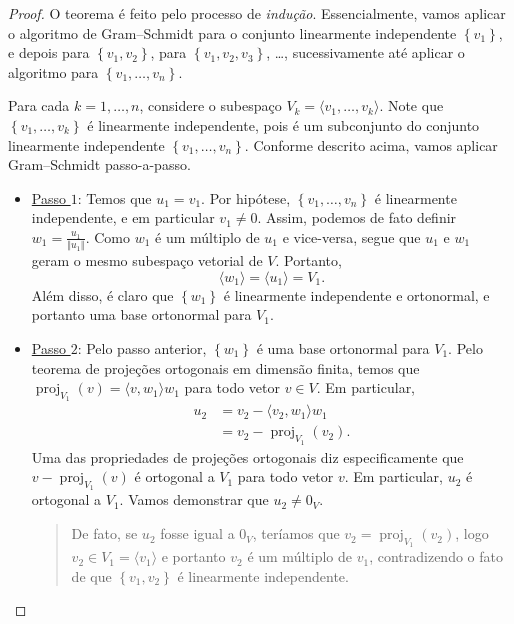 \begin{proof}
	O teorema é feito pelo processo de \textit{indução}. Essencialmente, vamos aplicar o algoritmo de Gram--Schmidt para o conjunto linearmente independente $\left\{v_1\right\}$, e depois para $\left\{v_1,v_2\right\}$, para $\left\{v_1,v_2,v_3\right\}$, \ldots, sucessivamente até aplicar o algoritmo para $\left\{v_1,\ldots,v_n\right\}$.
	
	Para cada $k=1,\ldots,n$, considere o subespaço $V_k=\langle v_1,\ldots,v_k\rangle$. Note que $\left\{v_1,\ldots,v_k\right\}$ é linearmente independente, pois é um subconjunto do conjunto linearmente independente $\left\{v_1,\ldots,v_n\right\}$. Conforme descrito acima, vamos aplicar Gram--Schmidt passo-a-passo.
	
	\begin{itemize}
		\item \uline{Passo $1$}: Temos que $u_1=v_1$. Por hipótese, $\left\{v_1,\ldots,v_n\right\}$ é linearmente independente, e em particular $v_1\neq 0$. Assim, podemos de fato definir $w_1=\frac{u_1}{\Vert u_1\Vert}$. Como $w_1$ é um múltiplo de $u_1$ e vice-versa, segue que $u_1$ e $w_1$ geram o mesmo subespaço vetorial de $V$. Portanto,
		\[\langle w_1\rangle=\langle u_1\rangle=V_1.\]
		Além disso, é claro que $\left\{w_1\right\}$ é linearmente independente e ortonormal, e portanto uma base ortonormal para $V_1$.
		
		\item \uline{Passo $2$}: Pelo passo anterior, $\left\{w_1\right\}$ é uma base ortonormal para $V_1$. Pelo teorema de projeções ortogonais em dimensão finita, temos que $\operatorname{proj}_{V_1}(v)=\langle v,w_1\rangle w_1$ para todo vetor $v\in V$. Em particular,
		\begin{align*}
			u_2
				&=v_2-\langle v_2,w_1\rangle w_1\\
				&=v_2-\operatorname{proj}_{V_1}(v_2).
			\end{align*}
		Uma das propriedades de projeções ortogonais diz especificamente que $v-\operatorname{proj}_{V_1}(v)$ é ortogonal a $V_1$ para todo vetor $v$. Em particular, $u_2$ é ortogonal a $V_1$. Vamos demonstrar que $u_2\neq 0_V$.
		
		\begin{quote}
			De fato, se $u_2$ fosse igual a $0_V$, teríamos que $v_2=\operatorname{proj}_{V_1}(v_2)$, logo $v_2\in V_1=\langle v_1\rangle$ e portanto $v_2$ é um múltiplo de $v_1$, contradizendo o fato de que $\left\{v_1,v_2\right\}$ é linearmente independente.
		\end{quote}
		

\end{itemize}
\end{proof}
